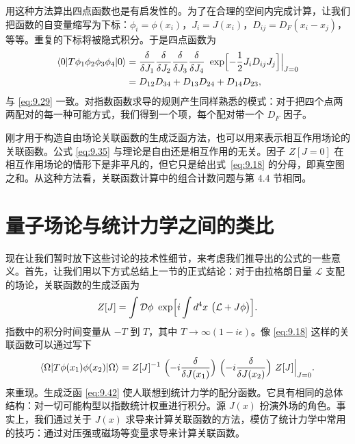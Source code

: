 用这种方法算出四点函数也是有启发性的。为了在合理的空间内完成计算，让我们把函数的自变量缩写为下标：$\phi_i = \phi(x_i)$，$J_i = J(x_i)$，$D_{ij} = D_F(x_i-x_j)$，等等。重复的下标将被隐式积分。于是四点函数为
\begin{equation}
  \begin{aligned}
    \langle 0|T\phi_1\phi_2\phi_3\phi_4|0\rangle
    &= \frac{\delta}{\delta J_1}\frac{\delta}{\delta J_2}
      \frac{\delta}{\delta J_3}\frac{\delta}{\delta J_4}\
      \exp\Bigl[ -\frac{1}{2}J_iD_{ij}J_j \Bigr]\Big|_{J=0}\\
    &= D_{12}D_{34} + D_{13}D_{24} + D_{14}D_{23} ,
  \end{aligned}
  \label{eq:9.41}
\end{equation}
与 \eqref{eq:9.29} 一致。对指数函数求导的规则产生同样熟悉的模式：对于把四个点两两配对的每一种可能方式，我们得到一个项，每个配对带一个 $D_F$ 因子。

刚才用于构造自由场论关联函数的生成泛函方法，也可以用来表示相互作用场论的关联函数。公式 \eqref{eq:9.35} 与理论是自由还是相互作用的无关。因子 $Z[J=0]$ 在相互作用场论的情形下是非平凡的，但它只是给出式~\eqref{eq:9.18} 的分母，即真空图之和。从这种方法看，关联函数计算中的组合计数问题与第 4.4 节相同。

\section{量子场论与统计力学之间的类比}

现在让我们暂时放下这些讨论的技术性细节，来考虑我们推导出的公式的一些意义。首先，让我们用以下方式总结上一节的正式结论：对于由拉格朗日量 $\mathcal{L}$ 支配的场论，关联函数的生成泛函为
\begin{equation}
  Z[J] = \int \mathcal{D}\phi\ \exp\Bigl[ i\int d^4x\
    \bigl( \mathcal{L} + J\phi \bigr) \Bigr] .
  \label{eq:9.42}
\end{equation}
指数中的积分时间变量从 $-T$ 到 $T$，其中 $T\to\infty(1-i\epsilon)$。像 \eqref{eq:9.18} 这样的关联函数可以通过写下
\begin{equation}
  \langle \Omega|T\phi(x_1)\phi(x_2)|\Omega\rangle
  = Z[J]^{-1}\ \Bigl( -i\frac{\delta}{\delta J(x_1)} \Bigr)\
    \Bigl( -i\frac{\delta}{\delta J(x_2)} \Bigr)\ Z[J]\Big|_{J=0} .
  \label{eq:9.43}
\end{equation}
来重现。生成泛函 \eqref{eq:9.42} 使人联想到统计力学的配分函数。它具有相同的总体结构：对一切可能构型以指数统计权重进行积分。源 $J(x)$ 扮演外场的角色。事实上，我们通过关于 $J(x)$ 求导来计算关联函数的方法，模仿了统计力学中常用的技巧：通过对压强或磁场等变量求导来计算关联函数。

